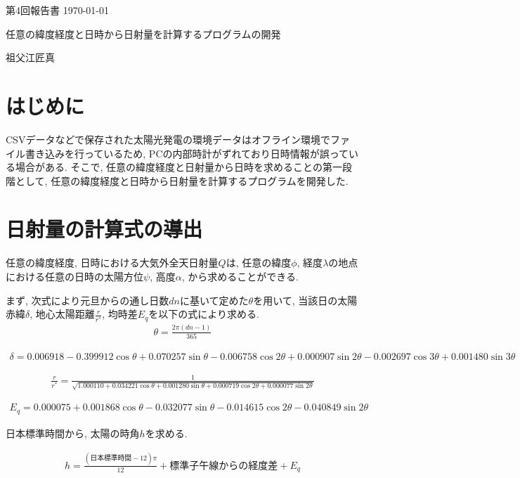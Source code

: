 \documentclass[a4j,12pt,]{jarticle}
\begin{document}
{\noindent\small 第4回報告書 \hfill\today}
\begin{center}
  {\Large 任意の緯度経度と日時から日射量を計算するプログラムの開発}
\end{center}
\begin{flushright}
  祖父江匠真 \\
\end{flushright}

\section{はじめに}
CSVデータなどで保存された太陽光発電の環境データはオフライン環境でファイル書き込みを行っているため, PCの内部時計がずれており日時情報が誤っている場合がある.
そこで, 任意の緯度経度と日射量から日時を求めることの第一段階として, 任意の緯度経度と日時から日射量を計算するプログラムを開発した.

\section{日射量の計算式の導出}
任意の緯度経度, 日時における大気外全天日射量$Q$は, 任意の緯度$\phi$, 経度$\lambda$の地点における任意の日時の太陽方位$\psi$, 高度$\alpha$, から求めることができる.

まず, 次式により元旦からの通し日数$dn$に基いて定めた$\theta$を用いて, 当該日の太陽赤緯$\delta$, 地心太陽距離$\frac{r}{r^{*}}$, 均時差$E_q$を以下の式により求める.
\begin{eqnarray}
  \theta =  \frac{2\pi (dn-1)}{365}
\end{eqnarray}

\begin{eqnarray}
  \delta =  0.006918-0.399912\cos \theta+0.070257\sin \theta-0.006758\cos 2\theta+0.000907\sin 2\theta-0.002697\cos 3\theta+0.001480\sin 3\theta
\end{eqnarray}

\begin{eqnarray}
  \frac{r}{r^{*}} =  \frac{1}{\sqrt{1.000110+0.034221\cos \theta+0.001280\sin \theta+0.000719\cos 2\theta+0.000077\sin 2\theta}}
\end{eqnarray}

\begin{eqnarray}
  E_q =  0.000075+0.001868\cos \theta-0.032077\sin \theta-0.014615\cos 2\theta-0.040849\sin 2\theta
\end{eqnarray}

日本標準時間から, 太陽の時角$h$を求める.

\begin{eqnarray}
  h = \frac{(日本標準時間-12)\pi}{12}+標準子午線からの経度差+E_q
\end{eqnarray}
\end{document}
